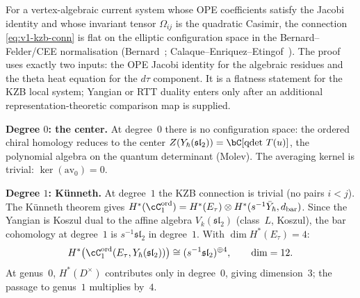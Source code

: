 \begin{example}
\begin{proposition}
\label{prop:elliptic-kzb-flatness-jacobi}
For a vertex-algebraic current system whose OPE coefficients
satisfy the Jacobi identity and whose invariant tensor
$\Omega_{ij}$ is the quadratic Casimir, the connection
\eqref{eq:v1-kzb-conn} is flat on the elliptic configuration
space in the Bernard--Felder/CEE normalisation
\textup{(}Bernard~\cite[\S\S3--4]{Bernard88};
Calaque--Enriquez--Etingof~\cite[Prop.~6.6]{CEE09}\textup{)}.
The proof uses exactly two inputs: the OPE Jacobi identity
for the algebraic residues and the theta heat equation for the
$d\tau$ component. It is a flatness statement for the KZB
local system; Yangian or RTT duality enters only after an
additional representation-theoretic comparison map is supplied.
\end{proposition}

\smallskip
\noindent
\textbf{Degree $0$: the center.} At degree~$0$ there is no
configuration space: the ordered chiral homology reduces to
the center $Z(Y_\hbar(\mathfrak{sl}_2))
= \bC[\operatorname{qdet}\,T(u)]$, the polynomial
algebra on the quantum determinant (Molev). The averaging
kernel is trivial: $\ker(\mathrm{av}_0) = 0$.

\smallskip
\noindent
\textbf{Degree $1$: K\"unneth.}
At degree~$1$ the KZB connection is trivial (no pairs
$i < j$). The K\"unneth theorem gives
$H^*(\cC_1^{\mathrm{ord}})
= H^*(E_\tau) \otimes H^*(s^{-1}\bar{Y}_\hbar,
d_{\mathrm{bar}})$. Since the Yangian is Koszul dual to
the affine algebra $V_k(\mathfrak{sl}_2)$ (class~$L$,
Koszul), the bar cohomology at degree~$1$ is
$s^{-1}\mathfrak{sl}_2$ in degree~$1$. With
$\dim H^*(E_\tau) = 4$:
\begin{equation}\label{eq:v1-ell-degree1}
 H^*\bigl(\cC_1^{\mathrm{ord}}(E_\tau,
 Y_\hbar(\mathfrak{sl}_2))\bigr)
 \cong (s^{-1}\mathfrak{sl}_2)^{\oplus 4},
 \qquad \dim = 12.
\end{equation}
At genus~$0$, $H^*(D^\times)$ contributes only in
degree~$0$, giving dimension~$3$; the passage to
genus~$1$ multiplies by~$4$.


\end{example}
